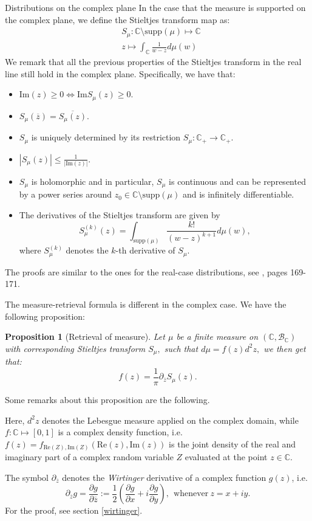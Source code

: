 \documentclass[11pt, a4paper, oneside]{book}
\numberwithin{equation}{chapter}
\newcommand{\beq}{\begin{equation}}
\newcommand{\eeq}{\end{equation}}
\newtheorem{prop}[thm]{Proposition}
\begin{document}
\begin{section}{Distributions on the complex plane} \label{S-Co}
In the case that the measure is supported on the complex plane, we define the Stieltjes transform map as:
%
\begin{align*}
&S_\mu: \mathbb{C} \setminus \mathrm{supp}(\mu) \mapsto \mathbb{C} \\
&z \mapsto \int_{\mathbb{C}} \frac{1}{w-z} d\mu(w)
\end{align*}
%
We remark that all the previous properties of the Stieltjes transform in the real line still hold in the complex plane. Specifically, we have that:
%
\begin{itemize}
    \item $\mathrm{Im}(z)\geq 0 \Leftrightarrow \mathrm{Im} S_\mu (z) \geq 0.$
    \item $S_\mu(\overline{z}) = \overline{S_\mu (z) }.$
    \item $S_\mu$ is uniquely determined by its restriction $S_\mu : \mathbb{C}_+ \to \mathbb{C}_+.$
    \item $|S_\mu(z)|\leq \frac{1}{|\mathrm{Im}(z)|}$.
    \item $S_\mu$ is holomorphic and in particular, $S_\mu$ is continuous and can be represented by a power series around $z_0 \in \mathbb{C}\setminus \mathrm{supp}(\mu)$ and is infinitely differentiable.
    \item The derivatives of the Stieltjes transform are given by
\[
S_\mu^{(k)}(z) = \int_{\mathrm{supp}(\mu)} \frac{k!}{(w-z)^{k+1}} d\mu(w),
\]
where $S_\mu^{(k)}$ denotes the $k$-th derivative of $S_\mu.$
\end{itemize}
%
The proofs are similar to the ones for the real-case distributions, see \cite{tao2023topics}, pages 169-171.

The measure-retrieval formula is different in the complex case. We have the following proposition:
\pagebreak

\begin{prop}[Retrieval of measure] \label{re-comp} Let $\mu$ be a finite measure on $(\mathbb{C},\mathcal{B}_{\mathbb{C}})$ with corresponding Stieltjes transform $S_\mu,$ such that $d\mu = f(z)d^2 z,$ we then get that:
\beq \label{retr2}
f(z) = \frac{1}{\pi} \partial_{\overline{z}} S_\mu (z).
\eeq
\end{prop}
%
Some remarks about this proposition are the following. 

Here, $d^2 z$ denotes the Lebesgue measure applied on the complex domain, while $f:\mathbb{C} \mapsto [0,1]$ is a complex density function, i.e. $f(z) = f_{\mathrm{Re}(Z),\mathrm{Im}(Z)} (\mathrm{Re}(z),\mathrm{Im}(z))$ is the joint density of the real and imaginary part of a complex random variable $Z$ evaluated at the point $z \in \mathbb{C}.$ 

The symbol $\partial_{\overline{z}}$ denotes the \textit{Wirtinger} derivative of a complex function $g(z)$, i.e.
\[
\partial_{\overline{z}} g = \frac{\partial g}{\partial \overline{z}} := \frac{1}{2} \left ( \frac{\partial g}{\partial x} + i \frac{\partial g}{\partial y} \right ), \ \ \text{whenever} \ z=x+iy.
\]
For the proof, see section \ref{wirtinger}.
\end{section}
\end{document}
